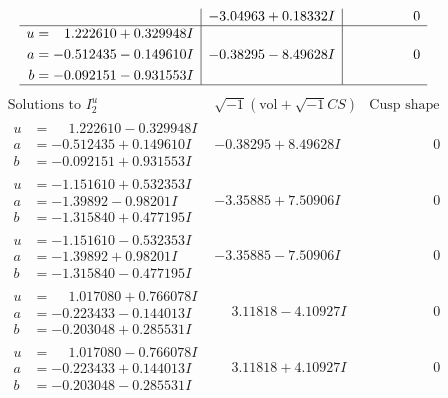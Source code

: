 \documentclass[1p]{elsarticle_modified}
\theoremstyle{definition}
\newcommand{\I}{\sqrt{-1}}
\begin{document}
$$\begin{array}{c|c|c}
 & -3.04963 + 0.18332 I & \phantom{-0.000000 } 0 \\ \hline\begin{aligned}
u &= \phantom{-}1.222610 + 0.329948 I \\
a &= -0.512435 - 0.149610 I \\
b &= -0.092151 - 0.931553 I\end{aligned}
 & -0.38295 - 8.49628 I & \phantom{-0.000000 } 0\\
 \hline 
 \end{array}$$\newpage$$\begin{array}{c|c|c}  
\text{Solutions to }I^u_{2}& \I (\text{vol} + \sqrt{-1}CS) & \text{Cusp shape}\\
 \hline 
\begin{aligned}
u &= \phantom{-}1.222610 - 0.329948 I \\
a &= -0.512435 + 0.149610 I \\
b &= -0.092151 + 0.931553 I\end{aligned}
 & -0.38295 + 8.49628 I & \phantom{-0.000000 } 0 \\ \hline\begin{aligned}
u &= -1.151610 + 0.532353 I \\
a &= -1.39892 - 0.98201 I \\
b &= -1.315840 + 0.477195 I\end{aligned}
 & -3.35885 + 7.50906 I & \phantom{-0.000000 } 0 \\ \hline\begin{aligned}
u &= -1.151610 - 0.532353 I \\
a &= -1.39892 + 0.98201 I \\
b &= -1.315840 - 0.477195 I\end{aligned}
 & -3.35885 - 7.50906 I & \phantom{-0.000000 } 0 \\ \hline\begin{aligned}
u &= \phantom{-}1.017080 + 0.766078 I \\
a &= -0.223433 - 0.144013 I \\
b &= -0.203048 + 0.285531 I\end{aligned}
 & \phantom{-}3.11818 - 4.10927 I & \phantom{-0.000000 } 0 \\ \hline\begin{aligned}
u &= \phantom{-}1.017080 - 0.766078 I \\
a &= -0.223433 + 0.144013 I \\
b &= -0.203048 - 0.285531 I\end{aligned}
 & \phantom{-}3.11818 + 4.10927 I & \phantom{-0.000000 } 0 \\ \hline\begin{aligned}

\end{aligned}
\end{array}$$
\end{document}
